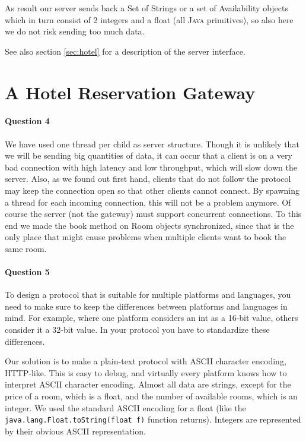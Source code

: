 \documentclass[a4paper,10pt]{article}
\begin{document}
As result our server sends back a Set of Strings or a set of
Availability objects which in turn consist of 2 integers and a float
(all \textsc{Java} primitives), so also here we do not risk sending too much
data.

See also section \ref{sec:hotel} for a description of the server
interface.

\section{A Hotel Reservation Gateway}
\paragraph{Question 4}
We have used one thread per child as server structure. Though it is
unlikely that we will be sending big quantities of data, it can occur
that a client is on a very bad connection with high latency and low
throughput, which will slow down the server. Also, as we found out
first hand, clients that do not follow the protocol may keep the
connection open so that other clients cannot connect. By spawning a
thread for each incoming connection, this will not be a problem
anymore. Of course the server (not the gateway) must support
concurrent connections. To this end we made the book method on Room
objects synchronized, since that is the only place that might cause
problems when multiple clients want to book the same room.

\paragraph{Question 5}
To design a protocol that is suitable for multiple platforms and
languages, you need to make sure to keep the differences between
platforms and languages in mind. For example, where one platform
considers an int as a 16-bit value, others consider it a 32-bit
value. In your protocol you have to standardize these differences.

Our solution is to make a plain-text protocol with \textsc{ASCII}
character
encoding, \textsc{HTTP}-like. This is easy to debug, and virtually every
platform knows how to interpret \textsc{ASCII} character encoding. Almost all
data are strings, except for the price of a room, which is a float,
and the number of available rooms, which is an integer. We
used the standard \textsc{ASCII} encoding for a float (like the
\texttt{java.lang.Float.toString(float f)} function
returns). Integers are represented by their obvious \textsc{ASCII}
representation.
\end{document}
